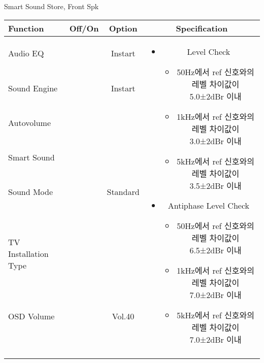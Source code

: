 \begin{frame}[t]{Smart Sound Store, Front Spk}
\begin{tiny}
\begin{tabular}{@{}lccc@{}}
\toprule
Function & Off/On & Option & Specification \\
\midrule
Audio EQ & \color{black}{Off} & Instart &
\multirow{10}{60mm}{
\begin{itemize}
	\item Level Check
	\begin{itemize}
		\item 50Hz에서 ref 신호와의 레벨 차이값이 5.0±2dBr 이내
		\item 1kHz에서 ref 신호와의 레벨 차이값이 3.0±2dBr 이내
		\item 5kHz에서 ref 신호와의 레벨 차이값이 3.5±2dBr 이내
	\end{itemize}
	\item Antiphase Level Check
	\begin{itemize}
		\item 50Hz에서 ref 신호와의 레벨 차이값이 6.5±2dBr 이내
		\item 1kHz에서 ref 신호와의 레벨 차이값이 7.0±2dBr 이내
		\item 5kHz에서 ref 신호와의 레벨 차이값이 7.0±2dBr 이내
	\end{itemize}
\end{itemize}
} \\
Sound Engine & \color{blue}{On} & Instart & \\
Autovolume & \color{black}{Off} & & \\
Smart Sound & \color{blue}{On} & & \\
Sound Mode & \color{blue}{On} & Standard & \\
TV Installation Type & \color{blue}{On} & \color{black}{Standtype1} & \\
OSD Volume & \color{blue}{On} & Vol.40 & \\
& & & \\
& & & \\
& & & \\
& & & \\
\midrule
\end{tabular}
\end{tiny}

\end{frame}


